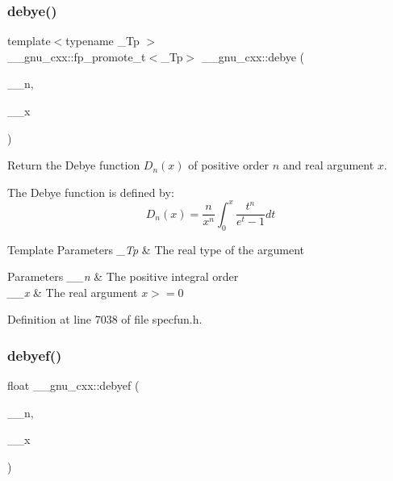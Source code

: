 \subsubsection{\texorpdfstring{debye()}{debye()}}
{\footnotesize\ttfamily template$<$typename \+\_\+\+Tp $>$ \\
\+\_\+\+\_\+gnu\+\_\+cxx\+::fp\+\_\+promote\+\_\+t$<$\+\_\+\+Tp$>$ \+\_\+\+\_\+gnu\+\_\+cxx\+::debye (\begin{DoxyParamCaption}\item[{unsigned int}]{\+\_\+\+\_\+n,  }\item[{\+\_\+\+Tp}]{\+\_\+\+\_\+x }\end{DoxyParamCaption})\hspace{0.3cm}{\ttfamily [inline]}}

Return the Debye function $ D_n(x) $ of positive order $ n $ and real argument $ x $.

The Debye function is defined by\+: \[ D_n(x) = \frac{n}{x^n}\int_{0}^{x}\frac{t^n}{e^t-1}dt \]


\begin{DoxyTemplParams}{Template Parameters}
{\em \+\_\+\+Tp} & The real type of the argument \\
\hline
\end{DoxyTemplParams}

\begin{DoxyParams}{Parameters}
{\em \+\_\+\+\_\+n} & The positive integral order \\
\hline
{\em \+\_\+\+\_\+x} & The real argument $ x >= 0 $ \\
\hline
\end{DoxyParams}


Definition at line 7038 of file specfun.\+h.

\mbox{\label{group__gnu__math__spec__func_ga683d3a885913b52db128aa5d624984a4}} 
\subsubsection{\texorpdfstring{debyef()}{debyef()}}
{\footnotesize\ttfamily float \+\_\+\+\_\+gnu\+\_\+cxx\+::debyef (\begin{DoxyParamCaption}\item[{unsigned int}]{\+\_\+\+\_\+n,  }\item[{float}]{\+\_\+\+\_\+x }\end{DoxyParamCaption})\hspace{0.3cm}{\ttfamily [inline]}}

